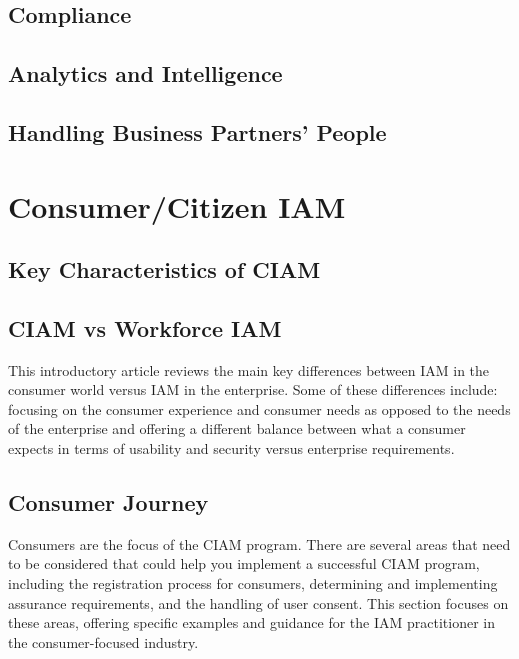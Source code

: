 \hypertarget{compliance}{%
\section{Compliance}\label{compliance}}

\hypertarget{analytics-and-intelligence}{%
\section{Analytics and
Intelligence}\label{analytics-and-intelligence}}

\hypertarget{handling-business-partners-people}{%
\section{Handling Business Partners'
People}\label{handling-business-partners-people}}

\hypertarget{consumercitizen-iam}{%
\chapter{Consumer/Citizen IAM}\label{consumercitizen-iam}}

\hypertarget{key-characteristics-of-ciam}{%
\section{Key Characteristics of
CIAM}\label{key-characteristics-of-ciam}}

\hypertarget{ciam-vs-workforce-iam}{%
\section{CIAM vs Workforce IAM}\label{ciam-vs-workforce-iam}}

This introductory article reviews the main key differences between IAM
in the consumer world versus IAM in the enterprise. Some of these
differences include: focusing on the consumer experience and consumer
needs as opposed to the needs of the enterprise and offering a different
balance between what a consumer expects in terms of usability and
security versus enterprise requirements.

\hypertarget{consumer-journey}{%
\section{Consumer Journey}\label{consumer-journey}}

Consumers are the focus of the CIAM program. There are several areas
that need to be considered that could help you implement a successful
CIAM program, including the registration process for consumers,
determining and implementing assurance requirements, and the handling of
user consent. This section focuses on these areas, offering specific
examples and guidance for the IAM practitioner in the consumer-focused
industry.

